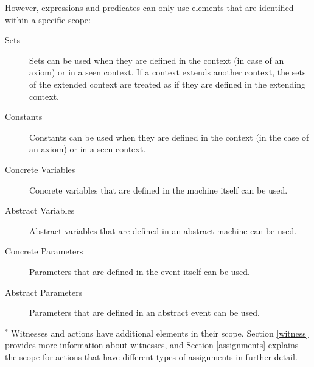However, expressions and predicates can only use elements that are identified within a specific scope:

\begin{description}
\item[Sets] Sets can be used when they are defined in the context (in case of an axiom) or in a seen context.
  If a context extends another context, the sets of the extended context are treated as if they
  are defined in the extending context.
\item[Constants] Constants can be used when they are defined in the context (in the case of an axiom) or in a seen context.
\item[Concrete Variables] Concrete variables that are defined in the machine itself can be used.
\item[Abstract Variables] Abstract variables  that are defined in an abstract machine can be used.
\item[Concrete Parameters] Parameters that are defined in the event itself can be used. 
\item[Abstract Parameters] Parameters that are defined in an abstract event can be used.
\end{description}



$\mbox{}^{*}$ Witnesses and actions have additional elements in their scope. Section \ref{witness} provides more information about witnesses, and Section \ref{assignments} explains the scope for actions that have different types of assignments in further detail.

